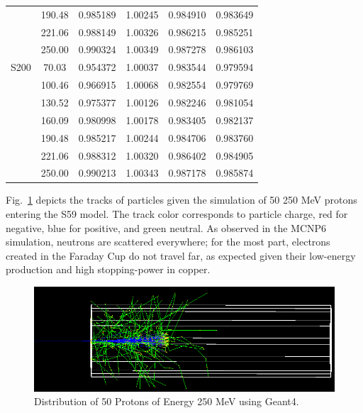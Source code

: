 \documentclass{mc2015}
\begin{document}
\begin{table}[H]
\begin{tabular}{lccccc}
        & 190.48 & \num{0.985189} & \num{1.00245} & \num{0.984910} & \num{0.983649} \\
        & 221.06 & \num{0.988149} & \num{1.00326} & \num{0.986215} & \num{0.985251} \\
        & 250.00 & \num{0.990324} & \num{1.00349} & \num{0.987278} & \num{0.986103} \\
    \midrule
    S200 & 70.03 & \num{0.954372} & \num{1.00037} & \num{0.983544} & \num{0.979594} \\
        & 100.46 & \num{0.966915} & \num{1.00068} & \num{0.982554} & \num{0.979769} \\
        & 130.52 & \num{0.975377} & \num{1.00126} & \num{0.982246} & \num{0.981054} \\
        & 160.09 & \num{0.980998} & \num{1.00178} & \num{0.983405} & \num{0.982137} \\
        & 190.48 & \num{0.985217} & \num{1.00244} & \num{0.984706} & \num{0.983760} \\
        & 221.06 & \num{0.988312} & \num{1.00320} & \num{0.986402} & \num{0.984905} \\
        & 250.00 & \num{0.990213} & \num{1.00343} & \num{0.987178} & \num{0.985874} \\
    \bottomrule
  \end{tabular}
  \label{tab:geant4_data}
\end{table}

Fig.~\ref{fig:G4_dist} depicts the tracks of particles given the simulation of 50 250 MeV protons entering the S59 model.  The track color corresponds to particle charge, red for negative, blue for positive, and green neutral.  As observed in the MCNP6 simulation, neutrons are scattered everywhere; for the most part, electrons created in the Faraday Cup do not travel far, as expected given their low-energy production and high stopping-power in copper.

\begin{figure}[H]
  \centering
  \includegraphics[width=5in]{figures/fig_G4_dist.png}
  \caption{Distribution of 50 Protons of Energy 250 MeV using Geant4.}
  \label{fig:G4_dist}
\end{figure}
\end{document}
